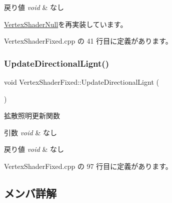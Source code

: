 \begin{DoxyRetVals}{戻り値}
{\em void} & なし \\
\hline
\end{DoxyRetVals}


\mbox{\hyperlink{class_vertex_shader_null_adf758f295d2803c6d8bd7e05e461abec}{Vertex\+Shader\+Null}}を再実装しています。



 Vertex\+Shader\+Fixed.\+cpp の 41 行目に定義があります。

\mbox{\label{class_vertex_shader_fixed_ae15e2c1ce81ca57cf657a6edff36cf9c}} 
\subsubsection{\texorpdfstring{Update\+Directional\+Lignt()}{UpdateDirectionalLignt()}}
{\footnotesize\ttfamily void Vertex\+Shader\+Fixed\+::\+Update\+Directional\+Lignt (\begin{DoxyParamCaption}{ }\end{DoxyParamCaption})\hspace{0.3cm}{\ttfamily [private]}}



拡散照明更新関数 


\begin{DoxyParams}{引数}
{\em void} & なし \\
\hline
\end{DoxyParams}

\begin{DoxyRetVals}{戻り値}
{\em void} & なし \\
\hline
\end{DoxyRetVals}


 Vertex\+Shader\+Fixed.\+cpp の 97 行目に定義があります。



\subsection{メンバ詳解}
\mbox{\label{class_vertex_shader_fixed_ae2409965de90816f89ba8797880b3cd2}} 
